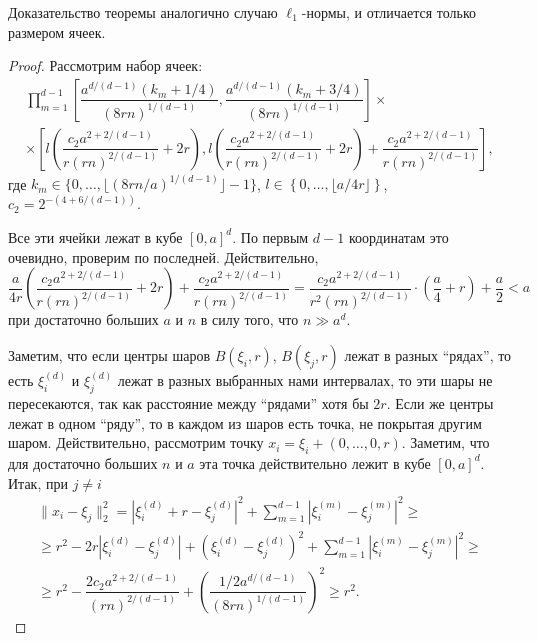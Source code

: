 \documentclass[12pt]{article}
\theoremstyle{plain}
\theoremstyle{definition}
\theoremstyle{remark}
\def\geq{\geqslant}
\begin{document}
Доказательство теоремы аналогично случаю $\ell_1$-нормы, и отличается только размером ячеек.
\begin{proof}
    Рассмотрим набор ячеек: 
    \begin{multline*}
        \prod\limits_{m=1}^{d-1}\left[\dfrac{a^{d/(d-1)}(k_m+1/4)}{(8rn)^{1/(d-1)}}, \dfrac{a^{d/(d-1)}(k_m+3/4)}{(8rn)^{1/(d-1)}}\right]
    \times \\
    \times \left[l\left(\dfrac{c_2a^{2 + 2/(d-1)}}{r(rn)^{2/(d-1)}} +2r\right) ,  l\left(\dfrac{c_2a^{2 + 2/(d-1)}}{r(rn)^{2/(d-1)}}+2r\right) + \dfrac{c_2a^{2 +2/(d-1)}}{r(rn)^{2/(d-1)}}  \right],
    \end{multline*}{}
    где $k_m \in \{0, \ldots, \lfloor (8rn/a)^{1/(d-1)}\rfloor-1\}$, $l\in \left\{0, \ldots, \lfloor a/4r\rfloor\right\}$, $c_2 = 2^{-(4+6/(d-1))}$. 
    
    Все эти ячейки лежат в кубе $[0,a]^d$. По первым $d-1$ координатам это очевидно, проверим по последней. Действительно, 
    \begin{equation*}
        \dfrac{a}{4r}\left(\dfrac{c_2a^{2 + 2/(d-1)}}{r(rn)^{2/(d-1)}}+2r\right) + \dfrac{c_2a^{2 +2/(d-1)}}{r(rn)^{2/(d-1)}} 
        =\dfrac{c_2a^{2+ 2/(d-1)}}{r^2(rn)^{2/(d-1)}}\cdot\left(\dfrac{a}{4} + r\right) + \dfrac{a}{2} 
        < a
    \end{equation*}{}
    при достаточно больших $a$ и $n$ в силу того, что $n \gg a^d$.
    
    Заметим, что если центры шаров $B(\xi_i, r)$, $B(\xi_j, r)$ лежат в разных ``рядах'', то есть $\xi_i^{(d)}$ и $\xi_j^{(d)}$ лежат в разных выбранных нами интервалах, то эти шары не пересекаются, так как расстояние между ``рядами'' хотя бы $2r$. Если же центры лежат в одном ``ряду'', то в каждом из шаров есть точка, не покрытая другим шаром. Действительно, рассмотрим точку  $x_i = \xi_i + (0, \ldots, 0, r)$. Заметим, что для достаточно больших $n$ и $a$ эта точка действительно лежит в кубе $[0, a]^d$. Итак, при $j \not= i$
        \begin{multline*}
        \|x_i - \xi_j\|^2_2 = 
        |\xi_i^{(d)} + r - \xi_j^{(d)} |^2 + \sum_{m=1}^{d-1}|\xi_i^{(m)} - \xi_j^{(m)}|^2 \geq\\
        \geq r^2 - 2r|\xi_i^{(d)} - \xi_j^{(d)}| + (\xi_i^{(d)} - \xi_j^{(d)})^2  + \sum_{m=1}^{d-1}|\xi_i^{(m)} - \xi_j^{(m)}|^2 \geq \\
        \geq r^2 - \dfrac{2c_2a^{2+2/(d-1)}}{(rn)^{2/(d-1)}} + \left(\dfrac{1/2a^{d/(d-1)}}{(8rn)^{1/(d-1)}}\right)^2 \geq r^2.
    \end{multline*}{}
    

\end{proof}
\end{document}
